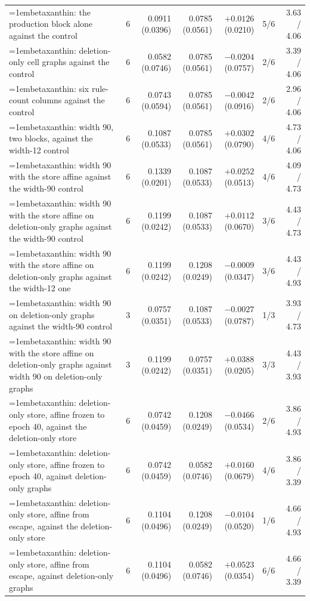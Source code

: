 \begin{table}[H]
\begin{tabular}{@{}>{\raggedright\hangindent=1em\hangafter=1\arraybackslash}p{78.5mm}rrrrrr@{}}
    betaxanthin: the production block alone against the control & 6 & 0.0911 (0.0396) & 0.0785 (0.0561) & $+0.0126$ (0.0210) & 5/6 & 3.63 / 4.06 \\
    betaxanthin: deletion-only cell graphs against the control & 6 & 0.0582 (0.0746) & 0.0785 (0.0561) & $-0.0204$ (0.0757) & 2/6 & 3.39 / 4.06 \\
    betaxanthin: six rule-count columns against the control & 6 & 0.0743 (0.0594) & 0.0785 (0.0561) & $-0.0042$ (0.0916) & 2/6 & 2.96 / 4.06 \\
    betaxanthin: width 90, two blocks, against the width-12 control & 6 & 0.1087 (0.0533) & 0.0785 (0.0561) & $+0.0302$ (0.0790) & 4/6 & 4.73 / 4.06 \\
    betaxanthin: width 90 with the store affine against the width-90 control & 6 & 0.1339 (0.0201) & 0.1087 (0.0533) & $+0.0252$ (0.0513) & 4/6 & 4.09 / 4.73 \\
    betaxanthin: width 90 with the store affine on deletion-only graphs against the width-90 control & 6 & 0.1199 (0.0242) & 0.1087 (0.0533) & $+0.0112$ (0.0670) & 3/6 & 4.43 / 4.73 \\
    betaxanthin: width 90 with the store affine on deletion-only graphs against the width-12 one & 6 & 0.1199 (0.0242) & 0.1208 (0.0249) & $-0.0009$ (0.0347) & 3/6 & 4.43 / 4.93 \\
    betaxanthin: width 90 on deletion-only graphs against the width-90 control & 3 & 0.0757 (0.0351) & 0.1087 (0.0533) & $-0.0027$ (0.0787) & 1/3 & 3.93 / 4.73 \\
    betaxanthin: width 90 with the store affine on deletion-only graphs against width 90 on deletion-only graphs & 3 & 0.1199 (0.0242) & 0.0757 (0.0351) & $+0.0388$ (0.0205) & 3/3 & 4.43 / 3.93 \\
    betaxanthin: deletion-only store, affine frozen to epoch 40, against the deletion-only store & 6 & 0.0742 (0.0459) & 0.1208 (0.0249) & $-0.0466$ (0.0534) & 2/6 & 3.86 / 4.93 \\
    betaxanthin: deletion-only store, affine frozen to epoch 40, against deletion-only graphs & 6 & 0.0742 (0.0459) & 0.0582 (0.0746) & $+0.0160$ (0.0679) & 4/6 & 3.86 / 3.39 \\
    betaxanthin: deletion-only store, affine from escape, against the deletion-only store & 6 & 0.1104 (0.0496) & 0.1208 (0.0249) & $-0.0104$ (0.0520) & 1/6 & 4.66 / 4.93 \\
    betaxanthin: deletion-only store, affine from escape, against deletion-only graphs & 6 & 0.1104 (0.0496) & 0.0582 (0.0746) & $+0.0523$ (0.0354) & 6/6 & 4.66 / 3.39 \\

\end{tabular}
\end{table}
